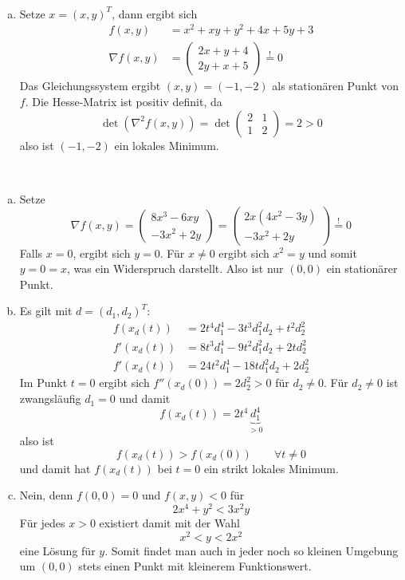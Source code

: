 \documentclass{mywork}
\begin{document}
\setcounter{aufgabe}{1}
\begin{aufgabe}~

	\begin{enumerate}[a)]
		\item
			Setze $x = (x,y)^T$, dann ergibt sich
			\begin{align*}
				f(x,y) &= x^2 + xy + y^2 + 4x + 5y + 3 \\
				\nabla f(x,y) &= \begin{pmatrix}
					2x + y + 4 \\
					2y + x + 5
				\end{pmatrix} \stackrel != 0
			\end{align*}
			Das Gleichungssystem ergibt $(x,y) = (-1,-2)$ als stationären Punkt von $f$.
			Die Hesse-Matrix ist positiv definit, da
			\[
				\det(\nabla^2 f(x,y)) = \det\begin{pmatrix}
					2 & 1 \\
					1 & 2
				\end{pmatrix} = 2 > 0
			\]
			also ist $(-1,-2)$ ein lokales Minimum.
	\end{enumerate}
\end{aufgabe}

\begin{aufgabe}~

	\begin{enumerate}[a)]
		\item
			Setze
			\[
				\nabla f(x,y) = \begin{pmatrix}
					8x^3 - 6xy \\
					-3x^2 + 2y
				\end{pmatrix} = \begin{pmatrix}
					2x(4x^2-3y) \\
					-3x^2 + 2y
				\end{pmatrix}\stackrel != 0
			\]
			Falls $x = 0$, ergibt sich $y=0$.
			Für $x \neq 0$ ergibt sich $x^2 = y$ und somit $y=0=x$, was ein Widerspruch darstellt.
			Also ist nur $(0,0)$ ein stationärer Punkt.
		\item
			Es gilt mit $d=(d_1,d_2)^T$:
			\begin{align*}
				f(x_d(t)) &= 2t^4d_1^4 - 3t^3 d_1^2 d_2 + t^2 d_2^2 \\
				f'(x_d(t)) &= 8t^3d_1^4 - 9t^2 d_1^2d_2 + 2td_2^2 \\
				f'(x_d(t)) &= 24t^2 d_1^4 - 18 t d_1^2 d_2 + 2d_2^2
			\end{align*}
			Im Punkt $t=0$ ergibt sich $f''(x_d(0)) = 2d_2^2 > 0$ für $d_2 \neq 0$.
			Für $d_2 \neq 0$ ist zwangsläufig $d_1 = 0$ und damit
			\[
				f(x_d(t)) = 2t^4 \underbrace{d_1^4}_{>0}
			\]
			also ist
			\[
				f(x_d(t)) > f(x_d(0)) \qquad \forall t \neq 0
			\]
			und damit hat $f(x_d(t))$ bei $t=0$ ein strikt lokales Minimum.
		\item
			Nein, denn $f(0,0) = 0$ und $f(x,y) < 0$ für
			\[
					2x^4 + y^2 < 3x^2y
			\]
			Für jedes $x>0$ existiert damit mit der Wahl
			\[
				x^2 < y < 2x^2
			\]
			eine Lösung für $y$.
			Somit findet man auch in jeder noch so kleinen Umgebung um $(0,0)$ stets einen Punkt mit kleinerem Funktionswert.
	\end{enumerate}
\end{aufgabe}
\end{document}
